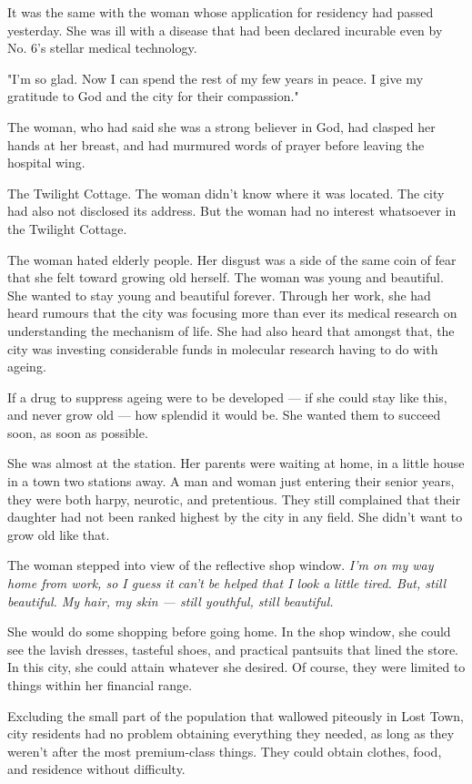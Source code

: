It was the same with the woman whose application for residency had
passed yesterday. She was ill with a disease that had been declared
incurable even by No. 6's stellar medical technology.

"I'm so glad. Now I can spend the rest of my few years in peace. I give
my gratitude to God and the city for their compassion."

The woman, who had said she was a strong believer in God, had clasped
her hands at her breast, and had murmured words of prayer before leaving
the hospital wing.

The Twilight Cottage. The woman didn't know where it was located. The
city had also not disclosed its address. But the woman had no interest
whatsoever in the Twilight Cottage.

The woman hated elderly people. Her disgust was a side of the same coin
of fear that she felt toward growing old herself. The woman was young
and beautiful. She wanted to stay young and beautiful forever. Through
her work, she had heard rumours that the city was focusing more than
ever its medical research on understanding the mechanism of life. She
had also heard that amongst that, the city was investing considerable
funds in molecular research having to do with ageing.

If a drug to suppress ageing were to be developed --- if she could stay
like this, and never grow old --- how splendid it would be. She wanted
them to succeed soon, as soon as possible.

She was almost at the station. Her parents were waiting at home, in a
little house in a town two stations away. A man and woman just entering
their senior years, they were both harpy, neurotic, and pretentious.
They still complained that their daughter had not been ranked highest by
the city in any field. She didn't want to grow old like that.

The woman stepped into view of the reflective shop window. \emph{I'm on my way
home from work, so I guess it can't be helped that I look a little
tired. But, still beautiful. My hair, my skin --- still youthful, still
beautiful.}

She would do some shopping before going home. In the shop window, she
could see the lavish dresses, tasteful shoes, and practical pantsuits
that lined the store. In this city, she could attain whatever she
desired. Of course, they were limited to things within her financial
range.

Excluding the small part of the population that wallowed piteously in
Lost Town, city residents had no problem obtaining everything they
needed, as long as they weren't after the most premium-class things.
They could obtain clothes, food, and residence without difficulty.

